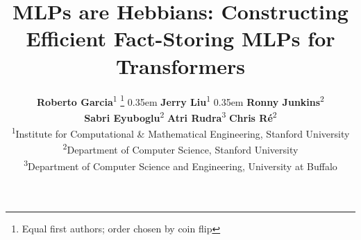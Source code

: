\title{MLPs are Hebbians: Constructing Efficient Fact-Storing MLPs for Transformers}

\makeatletter
\renewcommand{\thefootnote}{\fnsymbol{footnote}}
\newcommand{\thanksmark}[1]{\textsuperscript{\@fnsymbol{#1}}}
\newcommand{\corrauthormark}{\kern0.35em\textsuperscript{\@fnsymbol{2}}}
\makeatother

\author{
\textbf{Roberto Garcia}\textsuperscript{1}
  \thanks{Equal first authors; order chosen by coin flip}
  \corrauthormark
\quad
\textbf{Jerry Liu}\textsuperscript{1}
  \thanksmark{1}
  \hspace{-0.2cm}
  \corrauthormark
\quad
\textbf{Ronny Junkins}\textsuperscript{2}
  \thanksmark{1}
\\[0.3ex]
\textbf{Sabri Eyuboglu}\textsuperscript{2}
\quad
\textbf{Atri Rudra}\textsuperscript{3}
\quad
\textbf{Chris R{\'e}}\textsuperscript{2}
\\[1.5ex]
\textsuperscript{1}Institute for Computational \& Mathematical Engineering, Stanford University \\
\textsuperscript{2}Department of Computer Science, Stanford University \\
\textsuperscript{3}Department of Computer Science and Engineering, University at Buffalo
}

\newcommand{\hebbianposttitlefootnotes}{%
  \begingroup
  \renewcommand{\thefootnote}{\fnsymbol{footnote}}%
  \footnotetext[2]{Corresponding authors: \href{mailto:robgarct@stanford.edu}{\texttt{robgarct@stanford.edu}}, \href{mailto:jerrywliu@stanford.edu}{\texttt{jerrywliu@stanford.edu}}.}%
  \footnotetext[3]{Code is released at \url{https://github.com/HazyResearch/hebbian-mlps}.}%
  \endgroup
  \setcounter{footnote}{0}%
  \renewcommand{\thefootnote}{\arabic{footnote}}%
}
